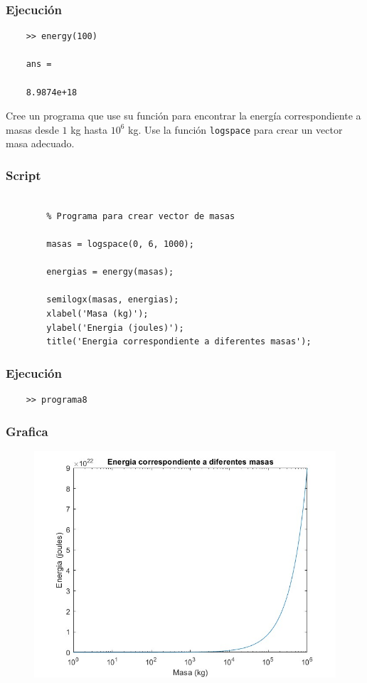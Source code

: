 \documentclass{article}
\begin{document}
	\subsubsection{Ejecución}
	
	\begin{lstlisting}
	>> energy(100)
	
	ans =
	
	8.9874e+18
	\end{lstlisting}
	
	Cree un programa que use su función para encontrar la energía correspondiente a masas desde $1$ kg hasta $10^6$ kg. Use la función \texttt{logspace} para crear un vector masa adecuado.
	
	\subsubsection{Script}
	
	\begin{lstlisting}
		
		% Programa para crear vector de masas
		
		masas = logspace(0, 6, 1000);
		
		energias = energy(masas);
		
		semilogx(masas, energias);
		xlabel('Masa (kg)');
		ylabel('Energia (joules)');
		title('Energia correspondiente a diferentes masas');
	\end{lstlisting}
	
	\subsubsection{Ejecución}
	
	\begin{lstlisting}
	>> programa8
	\end{lstlisting}
	
	\subsubsection{Grafica}
	
	\begin{figure}[H]
		\centering
		\includegraphics[width=\textwidth]{img8.jpg}
	\end{figure}
	
\end{document}
